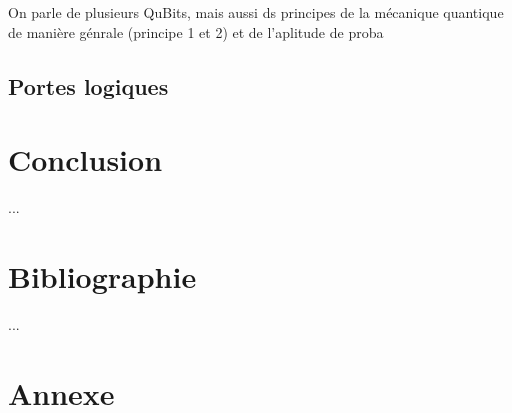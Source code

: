 \documentclass[a4paper,12pt]{report}
\newcommand{\para}[1]{\par{#1}\\}
\begin{document}
\para{
	On parle de plusieurs QuBits, mais aussi ds principes de la mécanique quantique de manière génrale (principe 1 et 2) et de l'aplitude de proba
}

	\section{Portes logiques}

%

\chapter*{Conclusion}

\para{
	...
}

\chapter*{Bibliographie}

\para{
	...
}


\chapter*{Annexe}
\end{document}
